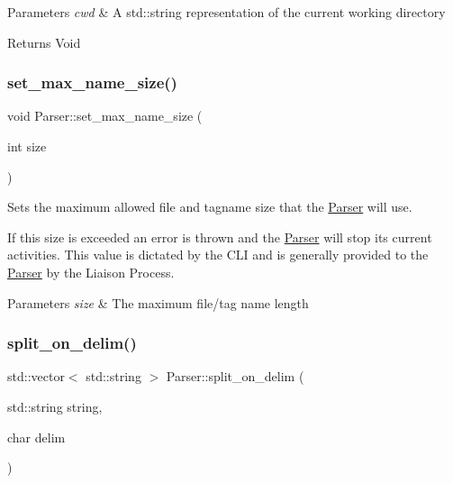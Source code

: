 \begin{DoxyParams}{Parameters}
{\em cwd} & A std\+::string representation of the current working directory\\
\hline
\end{DoxyParams}
\begin{DoxyReturn}{Returns}
Void 
\end{DoxyReturn}
\mbox{\label{class_parser_ac9c3bf43a7f27f92ecf538b83c5984d6}} 
\subsubsection{\texorpdfstring{set\+\_\+max\+\_\+name\+\_\+size()}{set\_max\_name\_size()}}
{\footnotesize\ttfamily void Parser\+::set\+\_\+max\+\_\+name\+\_\+size (\begin{DoxyParamCaption}\item[{int}]{size }\end{DoxyParamCaption})}



Sets the maximum allowed file and tagname size that the \mbox{\hyperlink{class_parser}{Parser}} will use. 

If this size is exceeded an error is thrown and the \mbox{\hyperlink{class_parser}{Parser}} will stop its current activities. This value is dictated by the C\+LI and is generally provided to the \mbox{\hyperlink{class_parser}{Parser}} by the Liaison Process.


\begin{DoxyParams}{Parameters}
{\em size} & The maximum file/tag name length \\
\hline
\end{DoxyParams}
\mbox{\label{class_parser_a71c87961db9707dc18db00a645d3d1e5}} 
\subsubsection{\texorpdfstring{split\+\_\+on\+\_\+delim()}{split\_on\_delim()}}
{\footnotesize\ttfamily std\+::vector$<$ std\+::string $>$ Parser\+::split\+\_\+on\+\_\+delim (\begin{DoxyParamCaption}\item[{std\+::string}]{string,  }\item[{char}]{delim }\end{DoxyParamCaption})\hspace{0.3cm}{\ttfamily [static]}}



